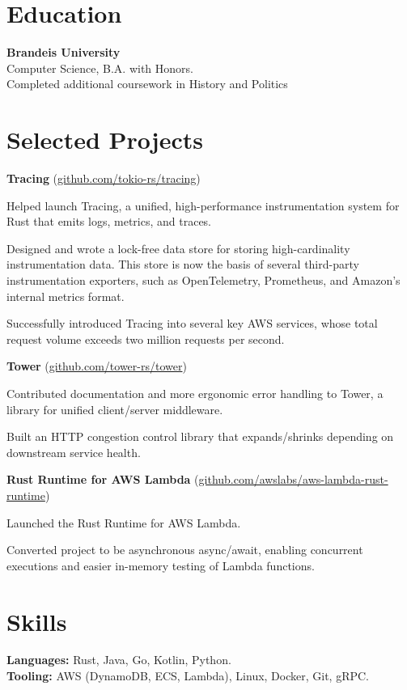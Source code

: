 \documentclass[10pt, a4paper]{article}
\newcommand{\note}[1]{\marginnote{\scriptsize #1}}
\renewenvironment{itemize}[1]{\begin{compactitem}#1}{\end{compactitem}}
\begin{document}
\section*{\textbf{Education}}
\note{Fall 2013—2017}\textbf{Brandeis University}\\
Computer Science, B.A. with Honors. \\
Completed additional coursework in History and Politics

\section*{\textbf{Selected Projects}}

\textbf{Tracing} (\href{https://github.com/tokio-rs/tracing}{github.com/tokio-rs/tracing})
\begin{itemize}
    \item Helped launch Tracing, a unified, high-performance instrumentation system for Rust that emits logs, metrics, and traces.
    \item Designed and wrote a lock-free data store for storing high-cardinality instrumentation data. This store is now the basis of several third-party instrumentation exporters, such as OpenTelemetry, Prometheus, and Amazon's internal metrics format.
    \item Successfully introduced Tracing into several key AWS services, whose total request volume exceeds two million requests per second.
\end{itemize}

\textbf{Tower} (\href{https://github.com/tokio-rs/tower}{github.com/tower-rs/tower})
\begin{itemize}
    \item Contributed documentation and more ergonomic error handling to Tower, a library for unified client/server middleware.
    \item Built an HTTP congestion control library that expands/shrinks depending on downstream service health.
\end{itemize}

\textbf{Rust Runtime for AWS Lambda} (\href{https://github.com/awslabs/aws-lambda-rust-runtime}{github.com/awslabs/aws-lambda-rust-runtime})
\begin{itemize}
    \item Launched the Rust Runtime for AWS Lambda.
    \item Converted project to be asynchronous async/await, enabling concurrent executions and easier in-memory testing of Lambda functions.
\end{itemize}
\section*{\textbf{Skills}}
\textbf{Languages:} Rust, Java, Go, Kotlin, Python. \\
\textbf{Tooling:} AWS (DynamoDB, ECS, Lambda), Linux, Docker, Git, gRPC.
\end{document}
